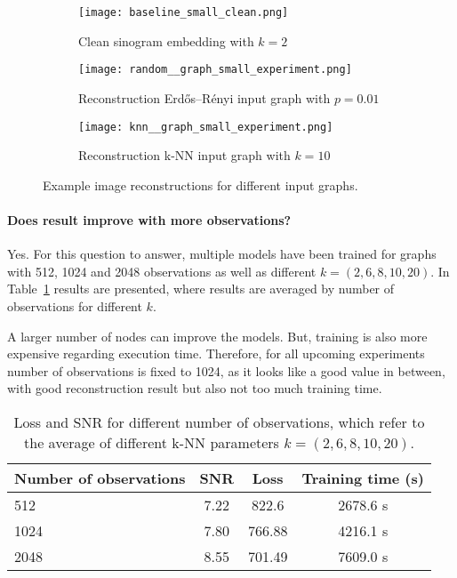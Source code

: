 \begin{figure}[H]
  \captionsetup[subfigure]{justification=centering}
  \centering
  \begin{subfigure}[t]{0.3\textwidth}
      \texttt{[image: baseline\_small\_clean.png]}
      \caption{Clean sinogram embedding with $k=2$}
      \label{fig:small_experiment_clean2}
  \end{subfigure}\hfill
  \begin{subfigure}[t]{0.3\textwidth}
    \texttt{[image: random\_\_graph\_small\_experiment.png]}
    \caption{Reconstruction Erdős–Rényi input graph with $p=0.01$}
    \label{fig:small_experiment_random_graph}
  \end{subfigure}\hfill
  \begin{subfigure}[t]{0.3\textwidth}
    \texttt{[image: knn\_\_graph\_small\_experiment.png]}
    \caption{Reconstruction k-NN input graph with $k=10$}
    \label{fig:small_experiment_knn_graph}
  \end{subfigure}
  \caption{Example image reconstructions for different input graphs.}
  \label{fig:input_graph_small}
\end{figure}



  \paragraph{Does result improve with more observations?}
  Yes.
  For this question to answer, multiple models have been trained for graphs with 512, 1024 and 2048 observations
  as well as different $k = (2,6,8,10,20)$.
  In Table~\ref{tab:graph_knn} results are presented, where results are averaged by number of observations 
  for different $k$.

  A larger number of nodes can improve the models. 
  But, training is also more expensive regarding execution time. 
  Therefore, for all upcoming experiments number of observations is fixed to 1024, as it looks like a good
  value in between, with good reconstruction result but also not too much training time.
  
  \begin{table}[H]
    \centering
      \begin{tabular}{l|ccc}
      \toprule
      \textbf{Number of observations} & \textbf{SNR} & \textbf{Loss} & \textbf{Training time (s)}  \\ 
      \midrule
      512  &  7.22    &  822.6  & 2678.6 s \\ \hline
      1024 &  7.80    &  766.88 & 4216.1 s \\ \hline
      2048 &  8.55    &  701.49 & 7609.0 s  \\ \hline
      \midrule
      \end{tabular}
    \caption{Loss and SNR for different number of observations, which refer to the average of 
    different k-NN parameters $k = (2,6,8,10,20)$.}
    \label{tab:graph_knn}
  \end{table}

